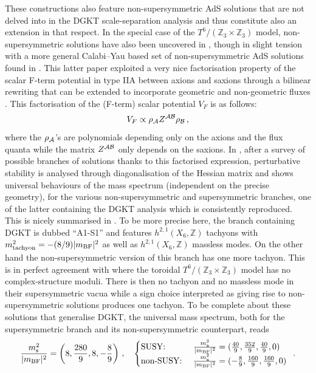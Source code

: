 \documentclass[11pt, a4paper]{article}
\newcommand{\A}{{\cal A}}
\newcommand{\B}{{\cal B}}
\newcommand{\Z}{\mathbb{Z}}
\begin{document}
These constructions also feature non-supersymmetric AdS solutions that are not delved into in the DGKT scale-separation analysis and thus constitute also an extension in that respect. In the special case of the $T^6/(\Z_3\times\Z_3)$ model, non-supersymmetric solutions have also been uncovered in \cite{Narayan:2010em}, though in slight tension with a more general Calabi--Yau based set of non-supersymmetric AdS solutions found in \cite{Marchesano:2019hfb}. This latter paper exploited a very nice factorisation property of the scalar F-term potential in type IIA between axions and saxions through a bilinear rewriting \cite{Bielleman:2015ina,Carta:2016ynn,Herraez:2018vae} that can be extended to incorporate geometric and non-geometric fluxes \cite{Marchesano:2020uqz}. This factorisation of the (F-term) scalar potential $V_F$ is as follows:
\begin{equation}
\label{eq:Vbi}
V_F\propto \rho_\A Z^{\A\B}\rho_\B\, ,
\end{equation}
%
where the $\rho_\A$'s are polynomials depending only on the axions and the flux quanta while the matrix $Z^{\A\B}$ only depends on the saxions. In \cite{Marchesano:2019hfb}, after a survey of possible branches of solutions thanks to this factorised expression, perturbative stability is analysed through diagonalisation of the Hessian matrix and shows universal behaviours of the mass spectrum (independent on the precise geometry), for the various non-supersymmetric and supersymmetric branches, one of the latter containing the DGKT analysis which is consistently reproduced. This is nicely summarised in \cite[Table 2]{Marchesano:2019hfb}. To be more precise here, the branch containing DGKT is dubbed ``A1-S1'' and features $h^{2,1}(X_6,\Z)$ tachyons with $m^2_{\rm tachyon}=-(8/9)|m_{\rm BF}|^2$ as well as $h^{2,1}(X_6,\Z)$ massless modes. On the other hand the non-supersymmetric version of this branch has one more tachyon. This is in perfect agreement with \cite{DeWolfe:2005uu} where the toroidal $T^6/(\Z_3\times\Z_3)$ model has no complex-structure moduli. There is then no tachyon and no massless mode in their supersymmetric vacua while a sign choice interpreted as giving rise to non-supersymmetric solutions produces one tachyon. To be complete about these solutions that generalise DGKT, the universal mass spectrum, both for the supersymmetric branch and its non-supersymmetric counterpart, reads \cite{Marchesano:2019hfb}
\begin{equation}
\label{universal_spectrum}
\frac{m_{\rm s}^2}{|m_{\rm BF}|^2}=\left(8,\frac{280}{9},8,-\frac{8}{9}\right)\, ,\quad\begin{cases}
\text{SUSY: }  &\frac{m_{\rm a}^2}{|m_{\rm BF}|^2}=(\frac{40}{9},\frac{352}{9},\frac{40}{9},0)\\
\text{non-SUSY: }  &\frac{m_{\rm a}^2}{|m_{\rm BF}|^2}=(-\frac{8}{9},\frac{160}{9},\frac{160}{9},0)\
\end{cases}\, .
\end{equation}
\end{document}
